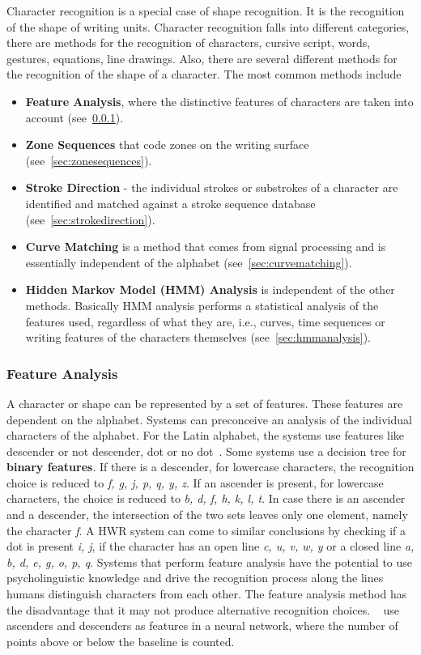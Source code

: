 Character recognition is a special case of shape recognition. It is the 
recognition of the shape of writing units. Character recognition falls into
different categories, there are methods for the recognition of characters,
cursive script, words, gestures, equations, line drawings. Also, there are 
several different methods for the recognition of the shape of a character.
The most common methods include 
\begin{itemize}
  \item \textbf{Feature Analysis}, where the distinctive features of characters 
    are taken into account (see~\ref{sec:featureanalysis}).
  \item \textbf{Zone Sequences} that code zones on the writing surface
    (see~\ref{sec:zonesequences}).
  \item \textbf{Stroke Direction} - the individual strokes or substrokes of a
    character are identified and matched against a stroke sequence database
    (see~\ref{sec:strokedirection}).
  \item \textbf{Curve Matching} is a method that comes from signal processing
    and is essentially independent of the alphabet (see~\ref{sec:curvematching}).
  \item \textbf{Hidden Markov Model (HMM) Analysis} is independent of the other methods.
    Basically HMM analysis performs a statistical analysis of the features used, 
    regardless of what they are, i.e., curves, time sequences or writing features
    of the characters themselves (see~\ref{sec:hmmanalysis}).
\end{itemize}

\subsubsection{Feature Analysis}
\label{sec:featureanalysis}
A character or shape can be represented by a set of features. These features are
dependent on the alphabet. Systems can preconceive an analysis 
of the individual characters of the alphabet. For the Latin alphabet, the 
systems use features like descender or not descender, dot or no 
dot~. Some systems use a decision tree for 
\textbf{binary features}. 
If there is a descender, for lowercase characters, the recognition choice is 
reduced to \emph{f, g, j, p, q, y, z}. If an ascender is present, for lowercase 
characters, the choice is reduced to \emph{b, d, f, h, k, l, t}. In case there
is an ascender and a descender, the intersection of the two sets leaves only 
one element, namely the character \emph{f}. A HWR system can come to similar 
conclusions by checking if a dot is present \emph{i, j}, if the character has an 
open line \emph{c, u, v, w, y} or a closed line \emph{a, b, d, e, g, o, p, q}. 
Systems that perform feature analysis have the potential to use psycholinguistic 
knowledge and drive the recognition process along the lines humans distinguish 
characters from each other. The feature analysis method has the disadvantage that
it may not produce alternative recognition choices.
~\citeyear{Jaeger2001} use 
ascenders and descenders as features in a neural network, 
where the number of points above or below the baseline is counted.

